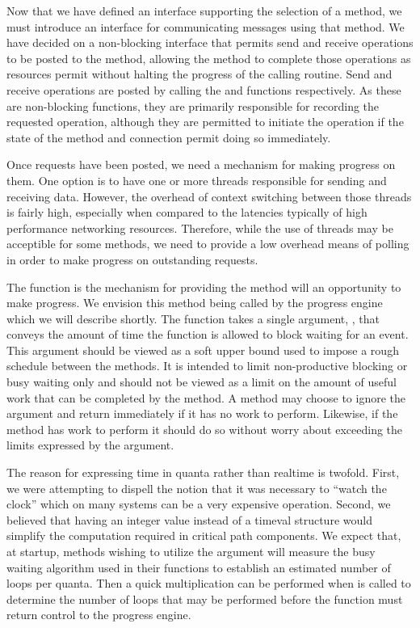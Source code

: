 Now that we have defined an interface supporting the selection of a method, we
must introduce an interface for communicating messages using that method.  We
have decided on a non-blocking interface that permits send and receive
operations to be posted to the method, allowing the method to complete those
operations as resources permit without halting the progress of the calling
routine.  Send and receive operations are posted by calling the
 and  functions respectively.
As these are non-blocking functions, they are primarily responsible for
recording the requested operation, although they are permitted to initiate the
operation if the state of the method and connection permit doing so
immediately.

Once requests have been posted, we need a mechanism for making progress on
them.  One option is to have one or more threads responsible for sending and
receiving data.  However, the overhead of context switching between those
threads is fairly high, especially when compared to the latencies typically of
high performance networking resources.  Therefore, while the use of threads may
be acceptible for some methods, we need to provide a low overhead means of
polling in order to make progress on outstanding requests.

The  function is the mechanism for providing the method will
an opportunity to make progress.  We envision this method being called by the
progress engine which we will describe shortly.  The  function takes
a single argument, , that conveys the amount of time the function
is allowed to block waiting for an event.  This argument should be viewed as a
soft upper bound used to impose a rough schedule between the methods.  It is
intended to limit non-productive blocking or busy waiting only and should not
be viewed as a limit on the amount of useful work that can be completed by the
method.  A method may choose to ignore the argument and return immediately if
it has no work to perform.  Likewise, if the method has work to perform it
should do so without worry about exceeding the limits expressed by the
 argument.

The reason for expressing time in quanta rather than realtime is twofold.
First, we were attempting to dispell the notion that it was necessary to
``watch the clock'' which on many systems can be a very expensive operation.
Second, we believed that having an integer value instead of a timeval structure
would simplify the computation required in critical path components.  We expect
that, at startup, methods wishing to utilize the  argument will
measure the busy waiting algorithm used in their  functions to
establish an estimated number of loops per quanta.  Then a quick multiplication
can be performed when  is called to determine the number of loops
that may be performed before the  function must return control to
the progress engine.

